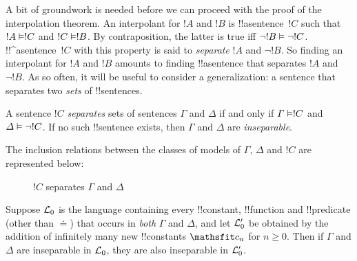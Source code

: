 \documentclass[../../../include/open-logic-section]{subfiles}
\begin{document}


A bit of groundwork is needed before we can proceed with the proof of
the interpolation theorem. An interpolant for $!A$ and $!B$ is
!!a{sentence}~$!C$ such that $!A \Entails !C$ and $!C \Entails !B$.
By contraposition, the latter is true iff $\lnot !B \Entails \lnot
!C$. !!^a{sentence}~$!C$ with this property is said to \emph{separate}
$!A$ and $\lnot !B$.  So finding an interpolant for $!A$ and $!B$
amounts to finding !!a{sentence} that separates $!A$ and $\lnot !B$.
As so often, it will be useful to consider a generalization: a
sentence that separates two \emph{sets} of !!{sentence}s.

\begin{defn}
A sentence $!C$ \emph{separates} sets of sentences $\Gamma$ and
$\Delta$ if and only if $\Gamma \Entails !C$ and $\Delta \Entails
\lnot !C$. If no such !!{sentence} exists, then $\Gamma$ and $\Delta$
are \emph{inseparable}.
\end{defn}

The inclusion relations between the classes of
models of $\Gamma$, $\Delta$ and $!C$ are represented below:
\begin{figure}[h]
  \centering
  \caption{$!C$ separates $\Gamma$ and $\Delta$}
\end{figure}


\begin{lem}
Suppose $\mathcal L_0$ is the language containing every !!{constant},
!!{function} and !!{predicate} (other than $\doteq$) that occurs in
\emph{both} $\Gamma$ and $\Delta$, and let $\mathcal L'_0$ be obtained
by the addition of infinitely many new !!{constant}s $\Obj c_n$ for $n
\ge 0$. Then if $\Gamma$ and $\Delta$ are inseparable in $\mathcal L_0$,
they are also inseparable in $\mathcal L'_0$.
\end{lem}
\end{document}
